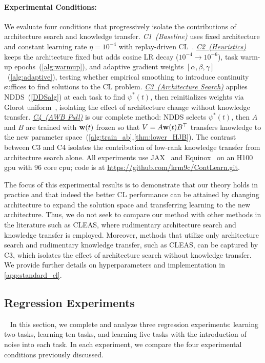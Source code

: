 \paragraph{Experimental Conditions:} We evaluate four conditions that progressively isolate the contributions of architecture search and knowledge transfer. \textit{C1~(Baseline)} uses fixed architecture and constant learning rate $\eta=10^{-4}$ with replay-driven CL~\cite{raghavan2021formalizing, raghavan2023learningcontinuallysequencegraphs}. \underline{\textit{C2~(Heuristics)}} keeps the architecture fixed but adds cosine LR decay ($10^{-4}\!\to\!10^{-6}$), task warm-up epochs~(\cref{alg:warmup}), and adaptive gradient weights $[\alpha,\beta,\gamma]$~(\cref{alg:adaptive}), testing whether empirical smoothing to introduce continuity suffices to find solutions to the CL problem. \underline{\textit{C3~(Architecture Search)}} applies NDDS~(\cref{DDSalg}) at each task to find $\psi^*(t)$, then reinitializes weights via Glorot uniform~\cite{GlorotB10}, isolating the effect of architecture change without knowledge transfer. \underline{\textit{C4~(AWB Full)}} is our complete method: NDDS selects $\psi^*(t)$, then $A$ and $B$ are trained with $\boldsymbol{\mathrm{w}}(t)$ frozen so that $V=A\boldsymbol{\mathrm{w}}(t)B^\top$ transfers knowledge to the new parameter space~(\cref{alg:train_ab},\cref{thm:lower_HJB}). The contrast between C3 and C4 isolates the contribution of low-rank knowledge transfer from architecture search alone. All experiments use JAX~\cite{jax} and Equinox~\cite{kidger2021equinox} on an H100 gpu with 96 core cpu; code is at \url{https://github.com/krm9c/ContLearn.git}. 

The focus of this experimental results is to demonstrate that our theory holds in practice and that indeed the better CL performance can be attained by changing architecture to expand the solution space and transferring learning to the new architecture. Thus, we do not seek to compare our method with other methods in the literature such as CLEAS, where rudimentary architecture search and knowledge transfer is employed. Moreover, methods that utilize only architecture search and rudimentary knowledge transfer, such as CLEAS, can be captured by C3, which isolates the effect of architecture search without knowledge transfer. We provide further details on hyperparameters and implementation in \cref{app:standard_cl}. 


\subsection{Regression Experiments}~\label{sec:reg}
In this section, we complete and analyze  three regression experiments: learning two tasks, learning ten tasks, and learning five tasks with the introduction of noise into each task. In each experiment, we compare the four experimental conditions previously discussed.

